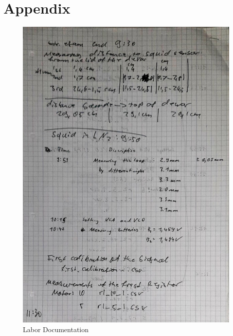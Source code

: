 \documentclass[30pt,a4paper]{article}
\begin{document}
	\section{Appendix}
	
	\begin{figure}[ht]
		\includegraphics[scale=0.3]{Bild/SQUID_(4)}
		\centering
		\caption{Labor Documentation}
	\end{figure}
\end{document}
